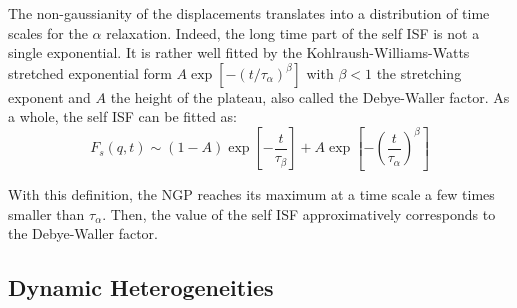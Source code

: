 The non-gaussianity of the displacements translates into a distribution of time scales for the $\alpha$ relaxation. Indeed, the long time part of the self \ac{ISF} is not a single exponential. It is rather well fitted by the Kohlraush-Williams-Watts~\citep{Kohlrausch1847, Williams1970} stretched exponential form $A \exp{\left[ -\left( t/\tau_\alpha \right)^\beta\right] }$ with $\beta<1$ the stretching exponent and $A$ the height of the plateau, also called the Debye-Waller factor. As a whole, the self \ac{ISF} can be fitted as:
\begin{equation}
	F_s(q,t) \sim (1-A) \exp{\left[-\frac{t}{\tau_\beta}\right] } + A \exp{\left[ -\left( \frac{t}{\tau_\alpha} \right)^\beta\right] }
	\label{eq:streched_exp_2steps}
\end{equation}

With this definition, the \ac{NGP} reaches its maximum at a time scale a few times smaller than $\tau_\alpha$. Then, the value of the self \ac{ISF} approximatively corresponds to the Debye-Waller factor.

\subsection{Dynamic Heterogeneities}
\label{sec:dynhet}


